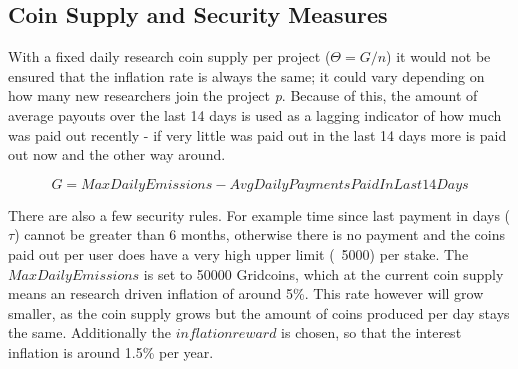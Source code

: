 \subsection{Coin Supply and Security Measures}

With a fixed daily research coin supply per project ($\Theta = G/n$) it would not be ensured that the inflation rate is always the same; it could vary depending on how many new researchers join the project \textit{p}. Because of this, the amount of average payouts over the last 14 days is used as a lagging indicator of how much was paid out recently - if very little was paid out in the last 14 days more is paid out now and the other way around.

\[ G = MaxDailyEmissions - AvgDailyPaymentsPaidInLast14Days \]

There are also a few security rules. For example time since last payment in days ($\tau$) cannot be greater than 6 months, otherwise there is no payment and the coins paid out per user does have a very high upper limit (~5000) per stake.
The $MaxDailyEmissions$ is set to 50000 Gridcoins, which at the current coin supply means an research driven inflation of around 5\%. This rate however will grow smaller, as the coin supply grows but the amount of coins produced per day stays the same. Additionally the $inflationreward$ is chosen, so that the interest inflation is around 1.5\% per year.
